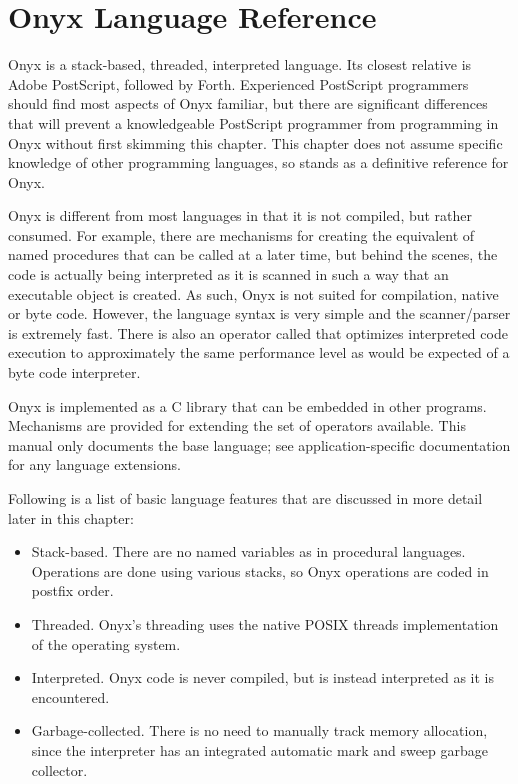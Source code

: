 %
%
%
%
%

\clearemptydoublepage
\chapter{Onyx Language Reference}
\label{onyxlang}

Onyx is a stack-based, threaded, interpreted language.  Its closest relative is
Adobe PostScript, followed by Forth.  Experienced PostScript programmers should
find most aspects of Onyx familiar, but there are significant differences that
will prevent a knowledgeable PostScript programmer from programming in Onyx
without first skimming this chapter.  This chapter does not assume specific
knowledge of other programming languages, so stands as a definitive reference
for Onyx.

Onyx is different from most languages in that it is not compiled, but rather
consumed.  For example, there are mechanisms for creating the equivalent of
named procedures that can be called at a later time, but behind the scenes, the
code is actually being interpreted as it is scanned in such a way that an
executable object is created.  As such, Onyx is not suited for compilation,
native or byte code.  However, the language syntax is very simple and the
scanner/parser is extremely fast.  There is also an operator called
 that optimizes interpreted code
execution to approximately the same performance level as would be expected of a
byte code interpreter.

Onyx is implemented as a C library that can be embedded in other programs.
Mechanisms are provided for extending the set of operators available.  This
manual only documents the base language; see application-specific documentation
for any language extensions.

Following is a list of basic language features that are discussed in more detail
later in this chapter:

\begin{itemize}
\item{Stack-based.  There are no named variables as in procedural languages.
Operations are done using various stacks, so Onyx operations are coded in
postfix order.}
\item{Threaded.  Onyx's threading uses the native POSIX threads implementation
of the operating system.}
\item{Interpreted.  Onyx code is never compiled, but is instead interpreted as
it is encountered.}
\item{Garbage-collected.  There is no need to manually track memory allocation,
since the interpreter has an integrated automatic mark and sweep garbage
collector.}
\end{itemize}

